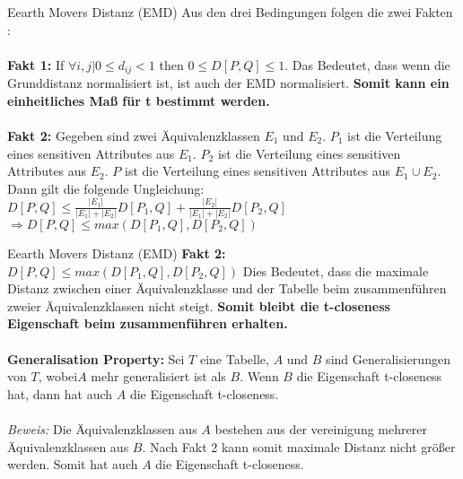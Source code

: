 \begin{frame}{Eearth Movers Distanz (EMD)}
Aus den drei Bedingungen folgen die zwei Fakten \cite{Li2007t-closseness}:\\
\ \\
\textbf{Fakt 1:} If $\forall i,j | 0 \le d_{ij} < 1$ then $0 \le D[P,Q]  \le 1$. 
Das Bedeutet, dass wenn die Grunddistanz normalisiert ist, ist auch der EMD normalisiert. \textbf{Somit kann ein einheitliches Maß für t bestimmt werden.}\\
\ \\
\textbf{Fakt 2:} Gegeben sind zwei Äquivalenzklassen $E_1$ und $E_2$.
$P_1$ ist die Verteilung eines sensitiven Attributes aus $E_1$.
$P_2$ ist die Verteilung eines sensitiven Attributes aus $E_2$.
$P$ ist die Verteilung eines sensitiven Attributes aus $E_1 \cup E_2$. Dann gilt die folgende Ungleichung: \\
$D[P,Q] \le \frac{|E_1|}{|E_1|+|E_2|}D[P_1,Q] + \frac{|E_2|}{|E_1|+|E_2|}D[P_2,Q]$\\
$\Rightarrow D[P,Q] \le max(D[P_1,Q], D[P_2,Q])$ 
\end{frame}

\begin{frame}{Eearth Movers Distanz (EMD)}
\textbf{Fakt 2:} $D[P,Q] \le max(D[P_1,Q], D[P_2,Q])$ 
Dies Bedeutet, dass die maximale Distanz zwischen einer Äquivalenzklasse und der Tabelle beim zusammenführen zweier Äquivalenzklassen nicht steigt. \textbf{Somit bleibt die t-closeness Eigenschaft beim zusammenführen erhalten.} \\ 
\ \\
\textbf{Generalisation Property:} Sei $T$ eine Tabelle, $A$ und $B$ sind Generalisierungen von $T$, wobei$A$ mehr generalisiert ist als $B$. Wenn $B$ die Eigenschaft t-closeness hat, dann hat auch $A$ die Eigenschaft t-closeness.\\
\ \\
\textit{Beweis:} Die Äquivalenzklassen aus $A$ bestehen aus der vereinigung mehrerer Äquivalenzklassen aus $B$. Nach Fakt 2 kann somit maximale Distanz nicht größer werden. Somit hat auch $A$ die Eigenschaft t-closeness.  
\end{frame}


